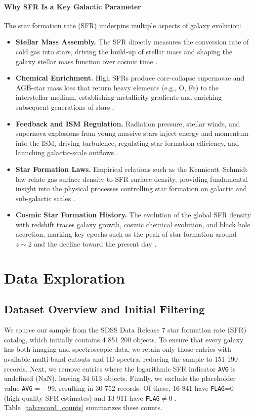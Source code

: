\documentclass[english,bachelor,oneside]{ctufit-thesis}
\begin{document}
\subsubsection{Why SFR Is a Key Galactic Parameter}  
The star formation rate (SFR) underpins multiple aspects of galaxy evolution:  
\begin{itemize}
  \item \textbf{Stellar Mass Assembly.} The SFR directly measures the conversion rate of cold gas into stars, driving the build-up of stellar mass and shaping the galaxy stellar mass function over cosmic time \cite{KennicuttEvans2012}.
  \item \textbf{Chemical Enrichment.} High SFRs produce core-collapse supernovae and AGB-star mass loss that return heavy elements (e.g., O, Fe) to the interstellar medium, establishing metallicity gradients and enriching subsequent generations of stars \cite{Prantzos2012}.
  \item \textbf{Feedback and ISM Regulation.} Radiation pressure, stellar winds, and supernova explosions from young massive stars inject energy and momentum into the ISM, driving turbulence, regulating star formation efficiency, and launching galactic-scale outflows \cite{Rupke2018}.
  \item \textbf{Star Formation Laws.} Empirical relations such as the Kennicutt–Schmidt law relate gas surface density to SFR surface density, providing fundamental insight into the physical processes controlling star formation on galactic and sub-galactic scales \cite{Kennicutt1998}.
  \item \textbf{Cosmic Star Formation History.} The evolution of the global SFR density with redshift traces galaxy growth, cosmic chemical evolution, and black hole accretion, marking key epochs such as the peak of star formation around $z\sim2$ and the decline toward the present day \cite{MadauDickinson2014}.
\end{itemize}

\newpage

\chapter{Data Exploration}
\label{ch:data_exploration}

\section{Dataset Overview and Initial Filtering}
We source our sample from the SDSS Data Release 7 star formation rate (SFR) catalog, which initially contains 4 851 200 objects. To ensure that every galaxy has both imaging and spectroscopic data, we retain only those entries with available multi-band cutouts and 1D spectra, reducing the sample to 151 190 records. Next, we remove entries where the logarithmic SFR indicator \texttt{AVG} is undefined (NaN), leaving 34 613 objects. Finally, we exclude the placeholder value \texttt{AVG} = $-99$, resulting in 30 752 records. Of these, 16 841 have \texttt{FLAG}=0 (high-quality SFR estimates) and 13 911 have \texttt{FLAG}$\neq$0 \cite{SDSS_SFR_DOC,data_exploring}. Table~\ref{tab:record_counts} summarizes these counts.
\end{document}
